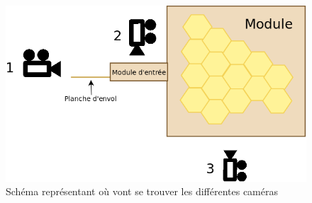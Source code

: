 \documentclass[11pt,french,a4paper]{report}
\begin{document}
\begin{figure}[!h]
\centering
\includegraphics[scale=0.3]{../images/dia/schema_camera.png}
    \caption{Schéma représentant où vont se trouver les différentes caméras}
    \label{sch_cam}
\end{figure}
\end{document}
